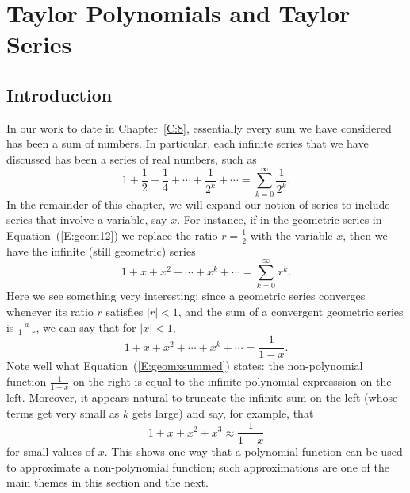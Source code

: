 \section{Taylor Polynomials and Taylor Series} \label{S:8.5.Taylor}

\vspace*{-14 pt}

\subsection*{Introduction}

In our work to date in Chapter~\ref{C:8}, essentially every sum we have considered has been a sum of numbers.  In particular, each infinite series that we have discussed has been a series of real numbers, such as
\begin{equation} \label{E:geom12}
1 + \frac{1}{2} + \frac{1}{4} + \cdots + \frac{1}{2^k} + \cdots = \sum_{k=0}^{\infty} \frac{1}{2^k}.
\end{equation}
In the remainder of this chapter, we will expand our notion of series to include series that involve a variable, say $x$.  For instance, if in the geometric series in Equation~(\ref{E:geom12}) we replace the ratio $r = \frac{1}{2}$ with the variable $x$, then we have the infinite (still geometric) series
\begin{equation} \label{E:geomx}
1 + x + x^2 + \cdots + x^k + \cdots = \sum_{k=0}^{\infty} x^k.
\end{equation}
Here we see something very interesting:  since a geometric series converges whenever its ratio $r$ satisfies $|r|<1$, and the sum of a convergent geometric series is $\frac{a}{1-r}$, we can say that for $|x| < 1$,
\begin{equation} \label{E:geomxsummed}
1 + x + x^2 + \cdots + x^k + \cdots = \frac{1}{1-x}.
\end{equation}
Note well what Equation~(\ref{E:geomxsummed}) states:  the non-polynomial function $\frac{1}{1-x}$ on the right is equal to the infinite polynomial expresssion on the left.  Moreover, it appears natural to truncate the infinite sum on the left (whose terms get very small as $k$ gets large) and say, for example, that
$$1 + x + x^2 + x^3 \approx \frac{1}{1-x}$$
for small values of $x$.  This shows one way that a polynomial function can be used to approximate a non-polynomial function; such approximations are one of the main themes in this section and the next.


